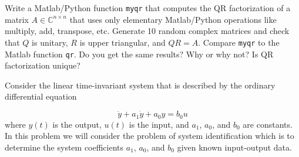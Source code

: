 \documentclass{exam}
\begin{document}
  \begin{problem}
      Write a Matlab/Python function \texttt{myqr} that computes the QR factorization of a matrix $A \in \mathds{C}^{n\times n}$ that uses only elementary Matlab/Python operations like multiply, add, transpose, etc. Generate 10 random complex matrices and check that $Q$ is unitary, $R$ is upper triangular, and $QR = A$. Compare \texttt{myqr} to the Matlab function \texttt{qr}. Do you get the same results? Why or why not? Is QR factorization unique?
  \end{problem}

  \begin{solution}
      
  \end{solution}

  \begin{problem}
     Consider the linear time-invariant system that is described by the ordinary differential equation 

     \[
         \ddot{y} + a_1\dot{y} + a_0y = b_0u
     \]
     where $y(t)$ is the output, $u(t)$ is the input, and $a_1$, $a_0$, and $b_0$ are constants. In this problem we will consider the problem of system identification which is to determine the system coefficients $a_1$, $a_0$, and $b_0$ given known input-output data.
  \end{problem}
\end{document}

